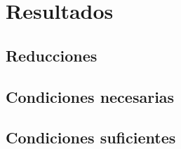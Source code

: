 \chapter{Resultados}

\section{Reducciones}

\section{Condiciones necesarias}

\section{Condiciones suficientes}